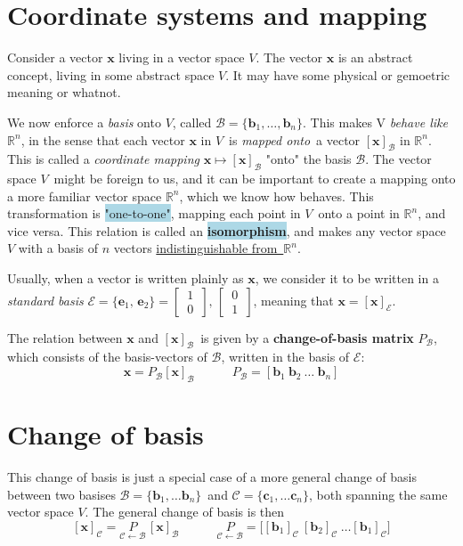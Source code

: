 \documentclass[12p,a4paper]{report}
\renewcommand{\b}{\boldsymbol}
\newcommand{\m}{\mathbb}
\newcommand{\bll}{\colorbox{lightblue}}
\begin{document}
\section{Coordinate systems and mapping}
Consider a vector $\b x$ living in a vector space $V$. The vector $\b x$ is an abstract concept, living in some abstract space $V$. It may have some physical or gemoetric meaning or whatnot.

We now enforce a \textit{basis} onto $V$, called $\mathcal{B} = \{\b b_1,\dots, \b b_n\}$. This makes V \textit{behave like} $\m R^n$, in the sense that each vector $\b x$ in $V$ is \textit{mapped onto} a vector $[\b x]_\mathcal{B}$ in $\m R^n$. This is called a \textit{coordinate mapping} $\b x \mapsto [\b x]_\mathcal{B}$ "onto" the basis $\mathcal{B}$. The vector space $V$ might be foreign to us, and it can be important to create a mapping onto a more familiar vector space $\m R^n$, which we know how behaves. This transformation is \bll{"one-to-one"}, mapping each point in $V$ onto a point in $\m R^n$, and vice versa. This relation is called an \bll{\textbf{isomorphism}}, and makes any vector space $V$ with a basis of $n$ vectors \underline{indistinguishable from $\m R^n$}.

Usually, when a vector is written plainly as $\b x$, we consider it to be written in a \textit{standard basis} $\mathcal{E} = \{\b e_1,\, \b e_2\} = \begin{bmatrix} \,1\, \\ \,0\, \end{bmatrix},\, \begin{bmatrix} \,0\, \\ \,1\, \end{bmatrix}$, meaning that $\b x = [\b x]_\mathcal{E}$.

The relation between $\b x$ and $[\b x]_\mathcal{B}$ is given by a \textbf{change-of-basis matrix} $P_\mathcal{B}$, which consists of the basis-vectors of $\mathcal{B}$, written in the basis of $\mathcal{E}$:
\[
    \b x = P_\mathcal{B}[\b x]_\mathcal{B}  \quad\quad\quad  P_\mathcal{B} = [\b b_1\ \b b_2\ \dots\ \b b_n]
\]


\section{Change of basis}
This change of basis is just a special case of a more general change of basis between two basises $\mathcal{B} = \{\b b_1, \dots \b b_n\}$ and $\mathcal{C} = \{\b c_1, \dots \b c_n\}$, both spanning the same vector space $V$. The general change of basis is then
\[
    [\b x]_\mathcal{C} = \underset{\mathcal{C}\leftarrow\mathcal{B}}{P}\,[\b x]_\mathcal{B} \quad\quad\quad
    \underset{\mathcal{C}\leftarrow\mathcal{B}}{P} = \Big[[\b b_1]_\mathcal{C}\ [\b b_2]_\mathcal{C}\ \dots [\b b_1]_\mathcal{C}\Big]
\]
\end{document}
